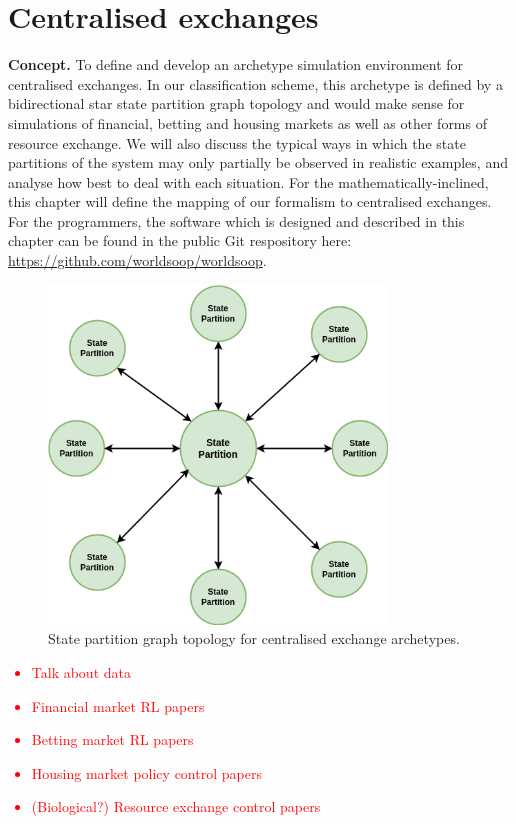 \chapter{\sffamily Centralised exchanges}

{\bfseries\sffamily Concept.} To define and develop an archetype simulation environment for centralised exchanges. In our classification scheme, this archetype is defined by a bidirectional star state partition graph topology and would make sense for simulations of financial, betting and housing markets as well as other forms of resource exchange. We will also discuss the typical ways in which the state partitions of the system may only partially be observed in realistic examples, and analyse how best to deal with each situation. For the mathematically-inclined, this chapter will define the mapping of our formalism to centralised exchanges. For the programmers, the software which is designed and described in this chapter can be found in the public Git respository here: \href{https://github.com/worldsoop/worldsoop}{https://github.com/worldsoop/worldsoop}.

\begin{figure}[h]
\centering
\includegraphics[width=9cm]{images/chapter-10-state-partition-graph.drawio.png}
\caption{State partition graph topology for centralised exchange archetypes.}
\label{fig:state-partition-graph-centralised-exchanges}
\end{figure}

\textcolor{red}{
\begin{itemize}
\item{Talk about data}
\item{Financial market RL papers}
\item{Betting market RL papers}
\item{Housing market policy control papers}
\item{(Biological?) Resource exchange control papers} 
\end{itemize}
}

